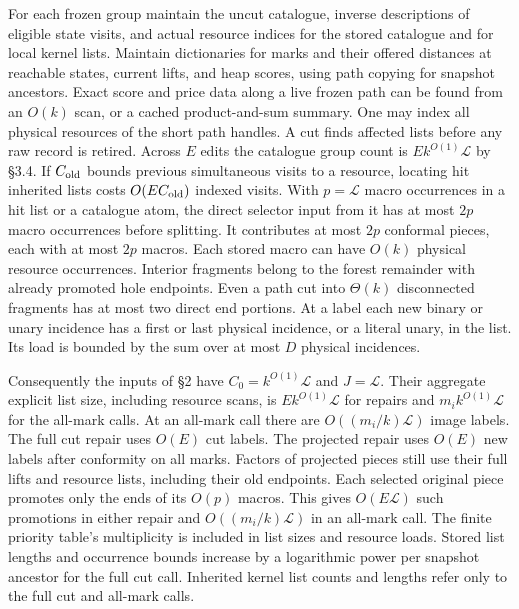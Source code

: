 \documentclass[11pt]{article}
\begin{document}
For each frozen group maintain the uncut catalogue, inverse descriptions of eligible state visits, and actual resource indices for the stored catalogue and for local kernel lists. Maintain dictionaries for marks and their offered distances at reachable states, current lifts, and heap scores, using path copying for snapshot ancestors. Exact score and price data along a live frozen path can be found from an \(O(k)\) scan, or a cached product-and-sum summary. One may index all physical resources of the short path handles. A cut finds affected lists before any raw record is retired. Across \(E\) edits the catalogue group count is \(E k^{O(1)}\mathcal L\) by §3.4. If \(C_{\rm old}\) bounds previous simultaneous visits to a resource, locating hit inherited lists costs \(O(E C_{\rm old})\) indexed visits. With \(p=\mathcal L\) macro occurrences in a hit list or a catalogue atom, the direct selector input from it has at most \(2p\) macro occurrences before splitting. It contributes at most \(2p\) conformal pieces, each with at most \(2p\) macros. Each stored macro can have \(O(k)\) physical resource occurrences. Interior fragments belong to the forest remainder with already promoted hole endpoints. Even a path cut into \(\Theta(k)\) disconnected fragments has at most two direct end portions. At a label each new binary or unary incidence has a first or last physical incidence, or a literal unary, in the list. Its load is bounded by the sum over at most \(D\) physical incidences.

Consequently the inputs of §2 have \(C_0=k^{O(1)}\mathcal L\) and \(J=\mathcal L\). Their aggregate explicit list size, including resource scans, is \(E k^{O(1)}\mathcal L\) for repairs and \(m_i k^{O(1)}\mathcal L\) for the all-mark calls. At an all-mark call there are \(O((m_i/k)\mathcal L)\) image labels. The full cut repair uses \(O(E)\) cut labels. The projected repair uses \(O(E)\) new labels after conformity on all marks. Factors of projected pieces still use their full lifts and resource lists, including their old endpoints. Each selected original piece promotes only the ends of its \(O(p)\) macros. This gives \(O(E\mathcal L)\) such promotions in either repair and \(O((m_i/k)\mathcal L)\) in an all-mark call. The finite priority table's multiplicity is included in list sizes and resource loads. Stored list lengths and occurrence bounds increase by a logarithmic power per snapshot ancestor for the full cut call. Inherited kernel list counts and lengths refer only to the full cut and all-mark calls.
\end{document}
